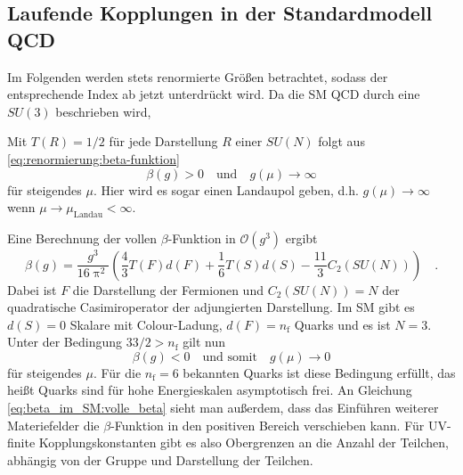\subsection{Laufende Kopplungen in der Standardmodell QCD}\label{beta_im_SM}
	Im Folgenden werden stets renormierte Größen betrachtet, sodass der 
	entsprechende Index ab jetzt unterdrückt wird. Da die SM QCD durch 
	eine $SU(3)$ beschrieben wird, 
	
	Mit $T(R)=1/2$ für jede Darstellung $R$ einer $SU(N)$ folgt aus 
   \eqref{eq:renormierung:beta-funktion} 
   \begin{equation}
	\beta(g)>0 \quad \text{und} \quad    
   g(\mu) \longrightarrow \infty
   \end{equation}
   für steigendes $\mu$. Hier wird es sogar einen Landaupol geben, d.h. 
   $g(\mu)\to \infty$ wenn $\mu\to \mu_\text{Landau}<\infty$.  
   
   Eine Berechnung der vollen $\beta$-Funktion in 
   $\mathcal{O}(g^3)$ ergibt 
   \cite{Luo_Wang_Xiao} 
   \begin{equation}
   \beta(g)=\frac{g^3}{16\uppi^2} \left( \frac{4}{3} T(F)d(F) +
   \frac{1}{6} T(S) d(S) - \frac{11}{3} C_2(SU(N)) \right)\quad .
   \label{eq:beta_im_SM:volle_beta}
   \end{equation}
   Dabei ist $F$ die Darstellung der Fermionen und $C_2(SU(N))=N$ der 
   quadratische Casimiroperator der adjungierten Darstellung. Im SM 
   gibt es $d(S)=0$ Skalare mit Colour-Ladung, $d(F)=n_\text{f}$ Quarks und 
   es ist $N=3$. Unter der Bedingung $33/2  >  n_\text{f}$ gilt nun 
	\begin{equation}
	\beta(g)<0 \quad \text{und somit} \quad g(\mu) \longrightarrow 0
	\end{equation}	   
	für steigendes $\mu$. Für die $n_\text{f}=6$ bekannten Quarks ist diese 
	Bedingung erfüllt, das heißt Quarks sind für hohe Energieskalen 
	asymptotisch frei. An Gleichung \eqref{eq:beta_im_SM:volle_beta} 
	sieht man außerdem, dass das Einführen weiterer Materiefelder 
	die $\beta$-Funktion in den positiven Bereich verschieben kann. Für 
	UV-finite Kopplungskonstanten gibt es also Obergrenzen an die Anzahl der 
	Teilchen, abhängig von der Gruppe und Darstellung der Teilchen.
	
   
   